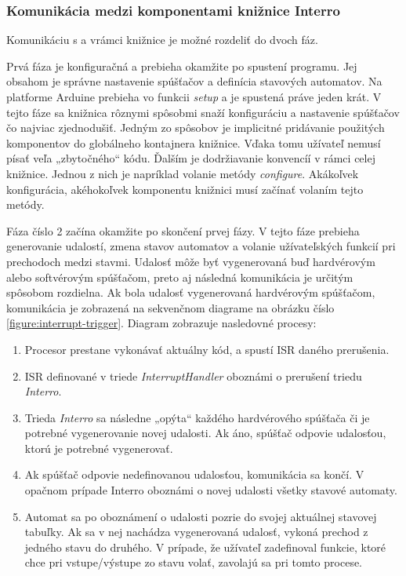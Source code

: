 \subsubsection{Komunikácia medzi komponentami knižnice Interro}
Komunikáciu s a vrámci knižnice je možné rozdeliť do dvoch fáz. \par
Prvá fáza je konfiguračná a prebieha okamžite po spustení programu. Jej obsahom je správne
nastavenie spúšťačov a definícia stavových automatov. Na platforme Arduine prebieha vo funkcii \textit{setup} a je spustená práve jeden krát. V tejto fáze sa knižnica
rôznymi spôsobmi snaží konfiguráciu a nastavenie spúšťačov čo najviac zjednodušiť. Jedným zo spôsobov je implicitné pridávanie použitých komponentov do globálneho
kontajnera knižnice. Vďaka tomu užívateľ nemusí písať veľa „zbytočného“ kódu. Ďalším je dodržiavanie konvencíí v rámci celej knižnice. Jednou z nich je napríklad
volanie metódy \textit{configure}. Akákoľvek konfigurácia, akéhokoľvek komponentu knižnici musí začínať volaním tejto metódy.  \par

Fáza číslo 2 začína okamžite po skončení prvej fázy. V tejto fáze prebieha generovanie  udalostí, zmena stavov automatov a volanie užívateľských funkcií pri prechodoch
medzi stavmi. Udalosť môže byť vygenerovaná buď hardvérovým alebo softvérovým spúšťačom,  preto aj následná komunikácia je určitým spôsobom rozdielna.
Ak bola udalosť vygenerovaná hardvérovým spúšťačom, komunikácia je zobrazená na sekvenčnom diagrame na obrázku číslo \ref{figure:interrupt-trigger}.
Diagram zobrazuje nasledovné procesy:
\begin{enumerate}
    \item Procesor prestane vykonávať aktuálny kód, a spustí ISR daného prerušenia.
    \item ISR definované v triede \textit{InterruptHandler} oboznámi o prerušení triedu \textit{Interro}.
    \item Trieda \textit{Interro} sa následne „opýta“ každého hardvérového spúšťača či je potrebné vygenerovanie novej udalosti. Ak áno, spúšťač odpovie udalosťou, ktorú je potrebné vygenerovať.
    \item Ak spúšťač odpovie nedefinovanou udalosťou, komunikácia sa končí. V opačnom prípade Interro oboznámi o novej udalosti všetky stavové automaty.
    \item Automat sa po oboznámení o udalosti pozrie do svojej aktuálnej stavovej tabuľky. Ak sa v nej nachádza vygenerovaná udalosť, vykoná prechod z jedného stavu do druhého.
          V prípade, že užívateľ zadefinoval funkcie, ktoré chce pri vstupe/výstupe zo stavu volať, zavolajú sa pri tomto procese.
\end{enumerate}

